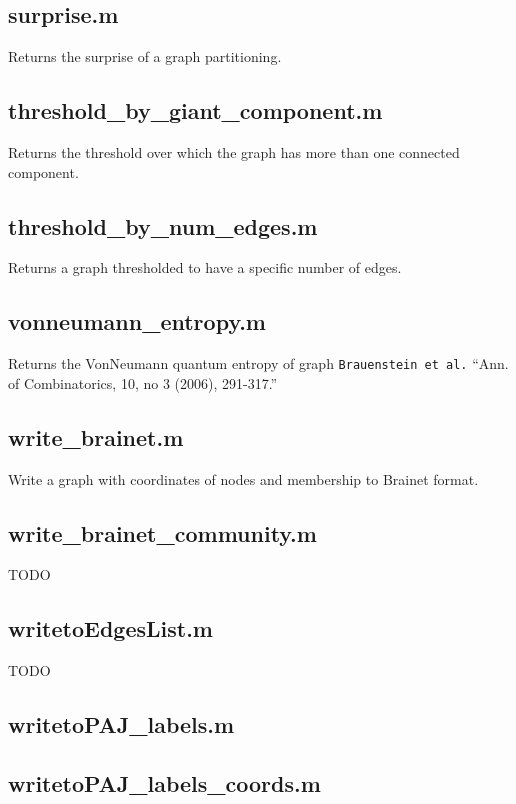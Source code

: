 \begin{itemize}[<+->]
  \subsection*{surprise.m} Returns the surprise of a graph partitioning.

  \subsection*{threshold\_by\_giant\_component.m} Returns the threshold over
  which the graph has more than one connected component.

  \subsection*{threshold\_by\_num\_edges.m} Returns a graph thresholded to
  have a specific number of edges.

  \subsection*{vonneumann\_entropy.m} Returns the VonNeumann quantum entropy
  of graph \texttt{Brauenstein\ et\ al.} ``Ann. of Combinatorics, 10, no
  3 (2006), 291-317.''

  \subsection*{write\_brainet.m} Write a graph with coordinates of nodes and
  membership to Brainet format.

  \subsection*{write\_brainet\_community.m} TODO

  \subsection*{writetoEdgesList.m} TODO

  \subsection*{writetoPAJ\_labels.m}

  \subsection*{writetoPAJ\_labels\_coords.m}
\end{itemize}


